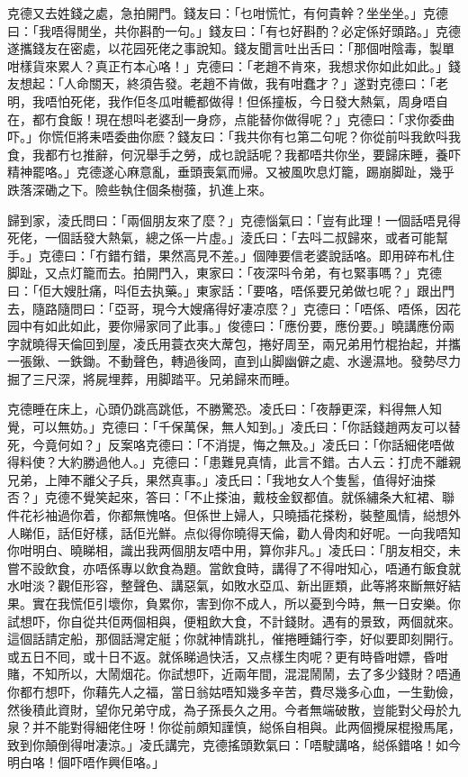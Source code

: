 \documentclass[a5paper, 12pt, openany]{book} %
\begin{document}
	克德又去姓錢之處，急拍開門。錢友曰：「乜咁慌忙，有何貴幹？坐坐坐。」克德曰：「我唔得閒坐，共你斟酌一句。」錢友曰：「有乜好斟酌？必定係好頭路。」克德遂攜錢友在密處，以花园死佬之事說知。錢友聞言吐出舌曰：「那個咁陰毒，製單咁樣貨來累人？真正冇本心咯！」克德曰：「老趙不肯來，我想求你如此如此。」錢友想起：「人命關天，終須告發。老趙不肯做，我有咁蠢才？」遂對克德曰：「老明，我唔怕死佬，我作佢冬瓜咁轆都做得！但係撞板，今日發大熱氣，周身唔自在，都冇食飯！現在想呌老婆刮一身痧，点能替你做得呢？」克德曰：「求你委曲吓。」你慌佢將耒唔委曲你麽？錢友曰：「我共你有乜第二句呢？你從前呌我飲呌我食，我都冇乜推辭，何況舉手之勞，成乜說話呢？我都唔共你坐，要歸床睡，養吓精神罷咯。」克德遂心麻意亂，垂頭喪氣而帰。又被風吹息灯籠，踢崩脚趾，幾乎跌落深磡之下。險些執住個条樹蔃，扒進上來。

	歸到家，淩氏問曰：「兩個朋友來了麼？」克德惱氣曰：「豈有此理！一個話唔見得死佬，一個話發大熱氣，總之係一片虛。」淩氏曰：「去呌二叔歸來，或者可能幫手。」克德曰：「冇錯冇錯，果然高見不差。」個陣要信老婆說話咯。即用碎布札住脚趾，又点灯籠而去。拍開門入，東家曰：「夜深呌令弟，有乜緊事嗎？」克德曰：「佢大嫂肚痛，呌佢去执藥。」東家話：「要咯，唔係要兄弟做乜呢？」跟出門去，隨路隨問曰：「亞哥，現今大嫂痛得好凄凉麼？」克德曰：「唔係、唔係，因花园中有如此如此，要你帰家同了此事。」俊德曰：「應份要，應份要。」曉講應份兩字就曉得天倫回到屋，凌氏用蓑衣夾大蓆包，捲好周至，兩兄弟用竹棍抬起，并攜一張鍬、一鉄鋤。不動聲色，轉過後岡，直到山脚幽僻之處、水邊濕地。發勢尽力掘了三尺深，將屍埋葬，用脚踏平。兄弟歸來而睡。

	克德睡在床上，心頭仍跳高跳低，不勝驚恐。凌氏曰：「夜靜更深，料得無人知覺，可以無妨。」克德曰：「千保萬保，無人知到。」凌氏曰：「你話錢趙两友可以替死，今竟何如？」反案咯克德曰：「不消提，悔之無及。」凌氏曰：「你話細佬唔做得料使？大約勝過他人。」克德曰：「患難見真情，此言不錯。古人云：打虎不離親兄弟，上陣不離父子兵，果然真事。」凌氏曰：「我地女人个隻䯻，值得好油搽否？」克德不覺笑起來，答曰：「不止搽油，戴枝金釵都值。就係繡条大紅裙、聯件花衫袖過你着，你都無愧咯。但係世上婦人，只曉插花搽粉，裝整風情，縂想外人睇佢，話佢好樣，話佢光鮮。点似得你曉得天倫，勸人骨肉和好呢。一向我唔知你咁明白、曉睇相，識出我两個朋友唔中用，算你非凡。」凌氏曰：「朋友相交，未嘗不設飲食，亦唔係專以飲食為題。當飲食時，講得了不得咁知心，唔通冇飯食就水咁淡？觀佢形容，整聲色、講惡氣，如敗水亞瓜、新出匪類，此等將來斷無好結果。實在我慌佢引壞你，負累你，害到你不成人，所以憂到今時，無一日安樂。你試想吓，你自從共佢两個相與，便粗飲大食，不計錢財。遇有的景致，两個就來。這個話請定船，那個話灣定艇；你就神情跳扎，催捲睡鋪行李，好似要即刻開行。或五日不囘，或十日不返。就係睇過快活，又点樣生肉呢？更有時昏咁嫖，昏咁賭，不知所以，大鬧烟花。你試想吓，近兩年間，混混鬧鬧，去了多少錢財？唔通你都冇想吓，你藉先人之福，當日翁姑唔知幾多辛苦，費尽幾多心血，一生勤儉，然後積此資財，望你兄弟守成，為子孫長久之用。今者無端破散，豈能對父母於九泉？并不能對得細佬住呀！你從前頗知謹慎，縂係自相與。此两個攪屎棍撥馬尾，致到你顛倒得咁凄涼。」凌氏講完，克德搖頭歎氣曰：「唔駛講咯，縂係錯咯！如今明白咯！個吓唔作興佢咯。」
\end{document}
